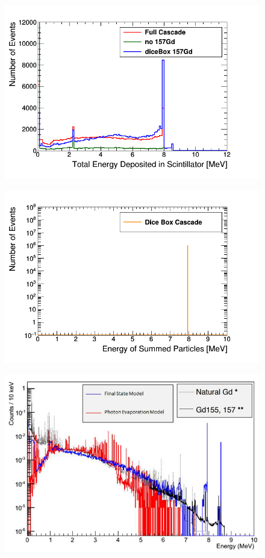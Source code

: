 \begin{figure}[H]
 \centering
 \includegraphics[width=0.7\linewidth]{Chapter4/Figs/Raster/gadolinium/depositedEnergyOfCascadeFinalStateDicebox.png}
 \label{fig:depositedEnergyOfCascadeFinalStateDicebox}
\end{figure}

\begin{figure}[H]
 \centering
 \includegraphics[width=0.7\linewidth]{Chapter4/Figs/Raster/gadolinium/conservationOfCascadeGd.png}
 \label{fig:conservationOfCascadeGd}
\end{figure}

\begin{figure}[H]
 \centering
 \includegraphics[width=0.7\linewidth]{Chapter4/Figs/Raster/gadolinium/comparisonGd.png}
 \label{fig:comparisonGd}
\end{figure}

